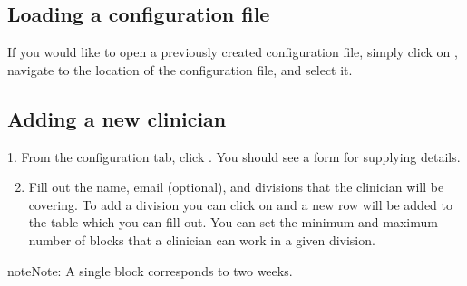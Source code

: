 \documentclass[letterpaper,10pt,english]{sphinxmanual}
\begin{document}
\begin{figure}[htbp]
\centering
{}\end{figure}


\subsection{Loading a configuration file}
\label{\detokenize{index:loading-a-configuration-file}}
If you would like to open a previously created configuration file, simply
click on , navigate to the location of the configuration file,
and select it.

\begin{figure}[htbp]
\centering
{}\end{figure}


\subsection{Adding a new clinician}
\label{\detokenize{index:adding-a-new-clinician}}\label{\detokenize{index:id4}}
1. From the configuration tab, click . You should see a
form for supplying details.

\begin{figure}[htbp]
\centering
{}\end{figure}

\begin{DUlineblock}{0em}
\item[] 
\end{DUlineblock}
\begin{enumerate}
\setcounter{enumi}{1}
\item {} 
Fill out the name, email (optional), and divisions that the clinician
will be covering. To add a division you can click on  and a new row
will be added to the table which you can fill out. You can set the minimum
and maximum number of blocks that a clinician can work in a given division.

\end{enumerate}

\begin{sphinxadmonition}{note}{Note:}
A single block corresponds to two weeks.
\end{sphinxadmonition}
\end{document}
